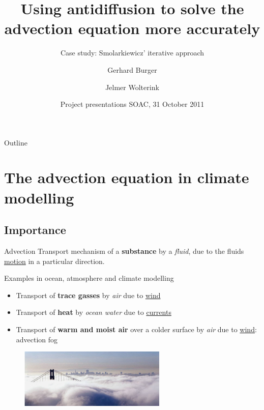 \documentclass[hyperref={pdfstartview=Fit}]{beamer}
\title[Advection equation and antidiffusion]
{Using antidiffusion to solve the advection equation more accurately}
\subtitle{Case study: Smolarkiewicz' iterative approach}
\author[Burger, Wolterink]
{Gerhard Burger \and Jelmer Wolterink}
\institute[Utrecht University]
{
  Scientific Computing\\
  Department of Mathematics\\
  Utrecht University
}
\date[31-Oct-2011] %
{Project presentations SOAC, 31 October 2011}
\begin{document}
\begin{frame}
  \titlepage
\end{frame}

\begin{frame}{Outline}
  \tableofcontents
\end{frame}

\section{The advection equation in climate modelling}
\subsection{Importance}

\begin{frame}

\begin{block}{Advection}
Transport mechanism of a \textbf{substance} by a \textit{fluid}, due to the fluids \underline{motion} in a particular direction.
\end{block}

Examples in ocean, atmosphere and climate modelling

\begin{itemize}
   \item Transport of \textbf{trace gasses} by \textit{air} due to \underline{wind}
   \item Transport of \textbf{heat} by \textit{ocean water} due to \underline{currents}
   \item Transport of \textbf{warm and moist air} over a colder surface by \textit{air} due to \underline{wind}: advection fog
\end{itemize}

\begin{figure}
\includegraphics[width=7cm]{advfog.png}
\end{figure}

\end{frame}
\end{document}

